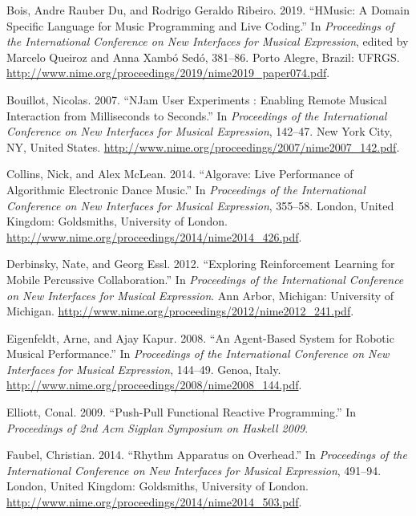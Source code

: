 \documentclass{nime-alternate} %
\newlength{\cslhangindent}
\newenvironment{cslreferences}%
  {\setlength{\parindent}{0pt}%
  \everypar{\setlength{\hangindent}{\cslhangindent}}\ignorespaces}%
  {\par}
\begin{document}
\hypertarget{refs}{}
\begin{cslreferences}
\leavevmode\hypertarget{ref-Rauber-Du-Bois2019}{}%
Bois, Andre Rauber Du, and Rodrigo Geraldo Ribeiro. 2019. ``HMusic: A
Domain Specific Language for Music Programming and Live Coding.'' In
\emph{Proceedings of the International Conference on New Interfaces for
Musical Expression}, edited by Marcelo Queiroz and Anna Xambó Sedó,
381--86. Porto Alegre, Brazil: UFRGS.
\url{http://www.nime.org/proceedings/2019/nime2019_paper074.pdf}.

\leavevmode\hypertarget{ref-Bouillot2007}{}%
Bouillot, Nicolas. 2007. ``NJam User Experiments : Enabling Remote
Musical Interaction from Milliseconds to Seconds.'' In \emph{Proceedings
of the International Conference on New Interfaces for Musical
Expression}, 142--47. New York City, NY, United States.
\url{http://www.nime.org/proceedings/2007/nime2007_142.pdf}.

\leavevmode\hypertarget{ref-ncollins2014}{}%
Collins, Nick, and Alex McLean. 2014. ``Algorave: Live Performance of
Algorithmic Electronic Dance Music.'' In \emph{Proceedings of the
International Conference on New Interfaces for Musical Expression},
355--58. London, United Kingdom: Goldsmiths, University of London.
\url{http://www.nime.org/proceedings/2014/nime2014_426.pdf}.

\leavevmode\hypertarget{ref-Derbinsky2012}{}%
Derbinsky, Nate, and Georg Essl. 2012. ``Exploring Reinforcement
Learning for Mobile Percussive Collaboration.'' In \emph{Proceedings of
the International Conference on New Interfaces for Musical Expression}.
Ann Arbor, Michigan: University of Michigan.
\url{http://www.nime.org/proceedings/2012/nime2012_241.pdf}.

\leavevmode\hypertarget{ref-Eigenfeldt2008}{}%
Eigenfeldt, Arne, and Ajay Kapur. 2008. ``An Agent-Based System for
Robotic Musical Performance.'' In \emph{Proceedings of the International
Conference on New Interfaces for Musical Expression}, 144--49. Genoa,
Italy. \url{http://www.nime.org/proceedings/2008/nime2008_144.pdf}.

\leavevmode\hypertarget{ref-Elliott09}{}%
Elliott, Conal. 2009. ``Push-Pull Functional Reactive Programming.'' In
\emph{Proceedings of 2nd Acm Sigplan Symposium on Haskell 2009}.

\leavevmode\hypertarget{ref-cfaubel12014}{}%
Faubel, Christian. 2014. ``Rhythm Apparatus on Overhead.'' In
\emph{Proceedings of the International Conference on New Interfaces for
Musical Expression}, 491--94. London, United Kingdom: Goldsmiths,
University of London.
\url{http://www.nime.org/proceedings/2014/nime2014_503.pdf}.


\end{cslreferences}
\end{document}

